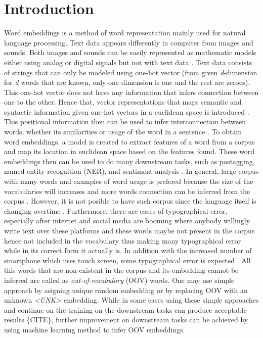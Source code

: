 \chapter{Introduction}
\label{chap:intro}

Word embeddings is a method of word representation mainly used for
natural language processing. Text data appears differently in computer
from images and sounds. Both images and sounds can be easily
represented as mathematic models either using analog or digital
signals but not with text data \citep{wordembedding2017yang}. Text
data consists of strings that can only be modeled using one-hot vector
(from given \textit{d}-dimension for \textit{d} words that are known,
only one dimension is one and the rest are zeroes). This one-hot
vector does not have any information that infers connection between
one to the other. Hence that, vector representations that maps
semantic and syntactic information given one-hot vectors in a
euclidean space is introduced \citep{wordembedding2017yang}. This
positional information then can be used to infer interconnection
between words, whether its similarities or usage of the word in a
sentence \citep{distributional1954harris}. To obtain word embeddings,
a model is created to extract features of a word from a corpus and map
its location in euclidean space based on the features found. These
word embeddings then can be used to do many downstream tasks, such as
postagging, named entity recognition (NER), and sentiment analysis
\citep{finding2015ling, neural2016lample}. In general, large corpus
with many words and examples of word usage is prefered because the
size of the vocabularies will increases and more words connection can
be inferred from the corpus \citep{size2018kutuzov}. However, it is
not posible to have such corpus since the language itself is changing
overtime \citep{forrester2008abrief}. Furthermore, there are cases of
typographical error, especially after internet and social media are
booming where anybody willingly write text over these platforms and
these words maybe not present in the corpus hence not included in the
vocabulary thus making many typographical error while in its correct
form it actually is. In addition with the increased number of
smartphone which uses touch screen, some typographical error is
expected \cite{ghosh2017correction}. All this words that are
non-existent in the corpus and its embedding cannot be inferred are
called as \textit{out-of-vocabulary} (OOV) words. One may use simple
approach by asigning unique random embedding or by replacing OOV with
an unknown \textit{\textless UNK\textgreater} embedding. While in some
cases using these simple approaches and continue on the training on
the downstream tasks can produce acceptable results \{CITE\}, further
improvement on downstream tasks can be achieved by using machine
learning method to infer OOV embeddings.

